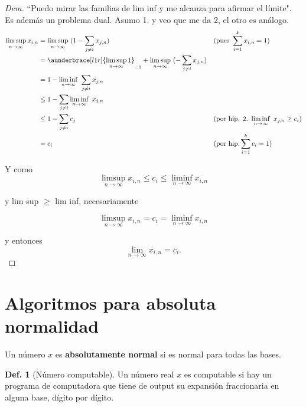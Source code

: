 \documentclass{report}
\theoremstyle{definition} %
\newtheorem{definition}{Def.}[chapter]
\begin{document}
\begin{proof}[Dem]
    ``Puedo mirar las familias de lim inf y me alcanza para afirmar el límite".
    Es además un problema dual. Asumo 1. y veo que me da 2, el otro es análogo.
    \begin{align*}
        \limsup_{n \to \infty} x_{i, n}
            &= \limsup_{n \to \infty}\ (1 - \sum_{j \neq i} x_{j, n})
            &&\text{(pues }\sum_{i=1}^{k} x_{i, n} = 1)\\
            &= 
                \aunderbrace[l1r]{\limsup_{n \to \infty} 1}_{=1} + 
                \limsup_{n \to \infty}\ (- \sum_{j \neq i} x_{j, n}) \\
            &= 1 - \liminf_{n \to \infty}\ \sum_{j \neq i} x_{j, n} \\
            &\leq 1 - \sum_{j \neq i} \liminf_{n \to \infty}\ x_{j, n} \\
            &\leq 1 - \sum_{j \neq i} c_j
            &&\text{(por hip. 2.\ }\liminf_{n \to \infty}\ x_{j, n} \geq c_i) \\
            &= c_i
            &&\text{(por hip.} \sum_{i = 1}^{k} c_i = 1)
    \end{align*}

    Y como
    $$\limsup_{n \to \infty} x_{i, n} \leq c_i \leq \liminf_{n \to \infty} x_{i,
    n}$$
    
    y lim sup $\geq$ lim inf, necesariamente

    $$\limsup_{n \to \infty} x_{i, n} = c_i = \liminf_{n \to \infty} x_{i,
    n}$$

    y entonces
    $$\lim_{n\to \infty} x_{i, n} = c_i.$$
\end{proof}

\section{Algoritmos para absoluta normalidad}

Un número $x$ es \textbf{absolutamente normal} si es normal para todas las
bases.

\begin{definition}[Número computable]
    Un número real $x$ es computable si hay un programa de computadora que tiene
    de output su expansión fraccionaria en alguna base, dígito por dígito.
\end{definition}
\end{document}
